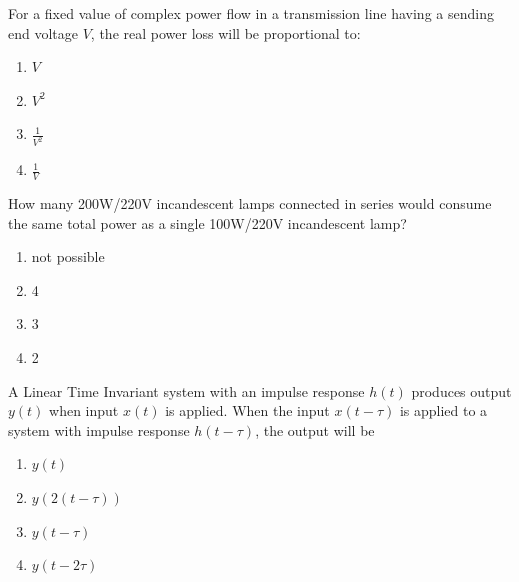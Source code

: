 \item For a fixed value of complex power flow in a transmission line having a sending end voltage $V$, the real power loss will be proportional to:

\begin{enumerate}
\item $V$
\item $V^2$
\item $\frac{1}{V^2}$
\item $\frac{1}{V}$
\end{enumerate}

\item How many 200W/220V incandescent lamps connected in series would consume the same total power as a single 100W/220V incandescent lamp?

\begin{enumerate}
\item not possible
\item 4
\item 3
\item 2
\end{enumerate}

\item A Linear Time Invariant system with an impulse response $h(t)$ produces output $y(t)$ when input $x(t)$ is applied. When the input $x(t - \tau)$ is applied to a system with impulse response $h(t - \tau)$, the output will be

\begin{enumerate}
\item $y(t)$
\item $y(2(t - \tau))$
\item $y(t - \tau)$
\item $y(t - 2\tau)$
\end{enumerate}

